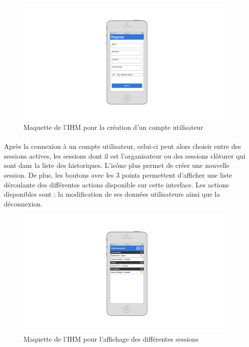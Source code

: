 \documentclass[titlepage, 12pt]{report}
\begin{document}
\begin{figure}[!h]
	\caption{Maquette de l'IHM pour la création d'un compte utilisateur}
	\label{create_user_account}
	\centering
	\includegraphics[scale=0.3]{images/mockups/register.png}
\end{figure}

\clearpage

\paragraph{}Après la connexion à un compte utilisateur, celui-ci peut alors choisir entre des sessions actives, les sessions dont il est l'organisateur ou des sessions clôturer qui sont dans la liste des historiques. L'icône plus permet de créer une nouvelle session. De plus, les boutons avec les 3 points permettent d'afficher une liste déroulante des différentes actions disponible sur cette interface. Les actions disponibles sont : la modification de ses données utilisateurs ainsi que la déconnexion.

\begin{figure}[!h]
	\caption{Maquette de l'IHM pour l'affichage des différentes sessions}
	\label{all_sessions}
	\centering
	\includegraphics[scale=0.3]{images/mockups/session_view.png}
\end{figure}
\end{document}
